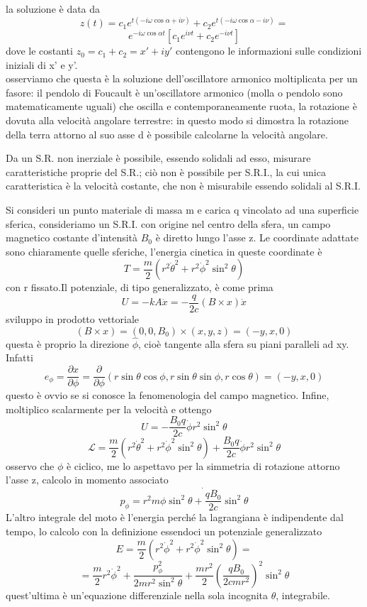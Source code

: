 \documentclass[
10pt, %
a4paper, %
oneside, %
headinclude,footinclude, %
BCOR5mm, %
]{scrartcl}
\begin{document}
\begin{esercizio}
	la soluzione è data da
	\[z(t) = c_1 e^{t (-i\omega\cos\alpha+ i\nu)} + c_2 e^{t (-i\omega\cos\alpha- i\nu)} = \]
	\[e^{-i\omega\cos\alpha t}\left[c_1e^{i\nu t} + c_2 e^{- i \nu t}\right]\]
	dove le costanti \(z_0 = c_1 + c_2 = x'+ i y'\) contengono le informazioni sulle condizioni iniziali di x' e y'.\\
	osserviamo che questa è la soluzione dell'oscillatore armonico moltiplicata per un fasore: il pendolo di Foucault è un'oscillatore armonico (molla o pendolo sono matematicamente uguali) che oscilla e contemporaneamente ruota, la rotazione è dovuta alla velocità angolare terrestre: in questo modo si dimostra la rotazione della terra attorno al suo asse  d è possibile calcolarne la velocità angolare.
\end{esercizio}
\begin{osservazione}
	Da un S.R. non inerziale è possibile, essendo solidali ad esso, misurare caratteristiche proprie del S.R.; ciò non è possibile per S.R.I., la cui unica caratteristica è la velocità costante, che non è misurabile essendo solidali al S.R.I. 
\end{osservazione}
\begin{esercizio}
Si consideri un punto materiale di massa m e carica q vincolato ad una superficie sferica, consideriamo un S.R.I. con origine nel centro della sfera, un campo magnetico costante d'intensità \(B_0\) è diretto lungo l'asse z. Le coordinate adattate sono chiaramente quelle sferiche, l'energia cinetica in queste coordinate è
\[T = \frac{m}{2}(r^2\dot{\theta}^2+r^2\dot{\phi}^2\sin^2\theta)\]
con r fissato.Il potenziale, di tipo generalizzato, è come prima
\[U = -kA\dot{x}= -\frac{q}{2c}(B \times x)\dot{x}\]
sviluppo in prodotto vettoriale 
\[(B \times x) = (0, 0, B_0)\times (x, y, z) = (-y, x, 0)\]
questa è proprio la direzione \(\hat{\phi}\), cioè tangente alla sfera su piani paralleli ad xy. Infatti
\[e_\phi = \frac{\partial x}{\partial \phi} = \frac{\partial }{\partial \phi}(r\sin\theta\cos\phi, r\sin\theta\sin\phi, r\cos\theta) = (-y, x, 0)\] 
questo è ovvio se si conosce la fenomenologia del campo magnetico. Infine, moltiplico scalarmente per la velocità e ottengo
\[U = -\frac{B_0 q}{2c}\dot{\phi}r^2\sin^2\theta\]
\[\mathcal{L} = \frac{m}{2}(r^2\dot{\theta}^2+r^2\dot{\phi}^2\sin^2\theta)+\frac{B_0 q}{2c}\dot{\phi}r^2\sin^2\theta\]
osservo che \(\phi\) è ciclico, me lo aspettavo per la simmetria di rotazione attorno l'asse z, calcolo in momento associato
\[p_\phi = r^2m\dot{\phi\sin^2\theta+\frac{q B_0}{2c}\sin^2\theta}\]
L'altro integrale del moto è l'energia perché la lagrangiana è indipendente dal tempo, lo calcolo con la definizione essendoci un potenziale generalizzato
\[ E = \frac{m}{2}(r^2\dot{\phi}^2+r^2\dot{\phi}^2\sin^2\theta)= \]
\[ = \frac{m}{2}r^2\dot{\phi}^2 + \frac{p_\phi^2}{2mr^2\sin^2\theta}+\frac{mr^2}{2}\left(\frac{q B_0}{2c mr^2}\right)^2\sin^2\theta\]
quest'ultima è un'equazione differenziale nella sola incognita $\theta$, integrabile.
\end{esercizio}
\end{document}
